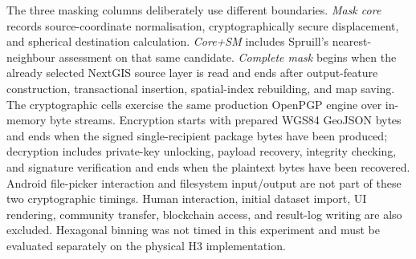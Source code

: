 \documentclass[]{interact}
\begin{document}
The three masking columns deliberately use different boundaries. \emph{Mask core} records source-coordinate normalisation, cryptographically secure displacement, and spherical destination calculation. \emph{Core+SM} includes Spruill's nearest-neighbour assessment on that same candidate. \emph{Complete mask} begins when the already selected NextGIS source layer is read and ends after output-feature construction, transactional insertion, spatial-index rebuilding, and map saving. The cryptographic cells exercise the same production OpenPGP engine over in-memory byte streams. Encryption starts with prepared WGS84 GeoJSON bytes and ends when the signed single-recipient package bytes have been produced; decryption includes private-key unlocking, payload recovery, integrity checking, and signature verification and ends when the plaintext bytes have been recovered. Android file-picker interaction and filesystem input/output are not part of these two cryptographic timings. Human interaction, initial dataset import, UI rendering, community transfer, blockchain access, and result-log writing are also excluded. Hexagonal binning was not timed in this experiment and must be evaluated separately on the physical H3 implementation.
\end{document}
